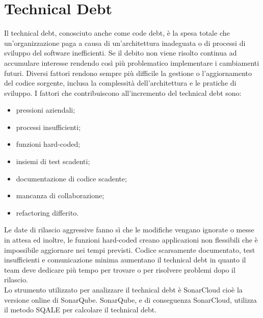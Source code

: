 \section{Technical Debt}
Il technical debt, conosciuto anche come code debt, è la spesa totale che un'organizzazione paga a causa di un'architettura inadeguata o di processi di sviluppo del software inefficienti. Se il debito non viene risolto continua ad accumulare interesse rendendo così più problematico implementare i cambiamenti futuri. Diversi fattori rendono sempre più difficile la gestione o l'aggiornamento del codice sorgente, inclusa la complessità dell'architettura e le pratiche di sviluppo. I fattori che contribuiscono all'incremento del technical debt sono:
\begin{itemize}
\item pressioni aziendali;
\item processi insufficienti;
\item funzioni hard-coded;
\item insiemi di test scadenti;
\item documentazione di codice scadente;
\item mancanza di collaborazione;
\item refactoring differito.
\end{itemize}
Le date di rilascio aggressive fanno sì che le modifiche vengano ignorate o messe in attesa ed inoltre, le funzioni hard-coded creano applicazioni non flessibili che è impossibile aggiornare nei tempi previsti. Codice scarsamente documentato, test insufficienti e comunicazione minima aumentano il technical debt in quanto il team deve dedicare più tempo per trovare o per risolvere problemi dopo il rilascio.\\ 
Lo strumento utilizzato per analizzare il technical debt è SonarCloud cioè la versione online di SonarQube. SonarQube, e di conseguenza SonarCloud, utilizza il metodo SQALE per calcolare il technical debt. 


